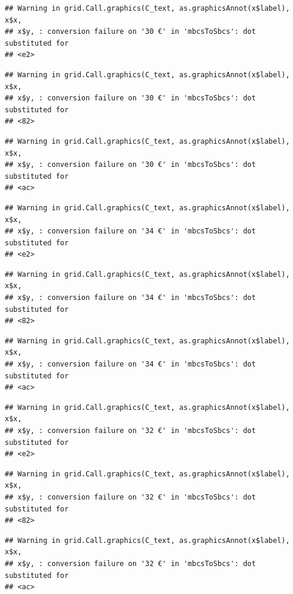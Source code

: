 \documentclass[]{gitbook}
\theoremstyle{definition}
\theoremstyle{definition}
\theoremstyle{definition}
\theoremstyle{remark}
\begin{document}
\begin{verbatim}
## Warning in grid.Call.graphics(C_text, as.graphicsAnnot(x$label), x$x,
## x$y, : conversion failure on '30 €' in 'mbcsToSbcs': dot substituted for
## <e2>
\end{verbatim}

\begin{verbatim}
## Warning in grid.Call.graphics(C_text, as.graphicsAnnot(x$label), x$x,
## x$y, : conversion failure on '30 €' in 'mbcsToSbcs': dot substituted for
## <82>
\end{verbatim}

\begin{verbatim}
## Warning in grid.Call.graphics(C_text, as.graphicsAnnot(x$label), x$x,
## x$y, : conversion failure on '30 €' in 'mbcsToSbcs': dot substituted for
## <ac>
\end{verbatim}

\begin{verbatim}
## Warning in grid.Call.graphics(C_text, as.graphicsAnnot(x$label), x$x,
## x$y, : conversion failure on '34 €' in 'mbcsToSbcs': dot substituted for
## <e2>
\end{verbatim}

\begin{verbatim}
## Warning in grid.Call.graphics(C_text, as.graphicsAnnot(x$label), x$x,
## x$y, : conversion failure on '34 €' in 'mbcsToSbcs': dot substituted for
## <82>
\end{verbatim}

\begin{verbatim}
## Warning in grid.Call.graphics(C_text, as.graphicsAnnot(x$label), x$x,
## x$y, : conversion failure on '34 €' in 'mbcsToSbcs': dot substituted for
## <ac>
\end{verbatim}

\begin{verbatim}
## Warning in grid.Call.graphics(C_text, as.graphicsAnnot(x$label), x$x,
## x$y, : conversion failure on '32 €' in 'mbcsToSbcs': dot substituted for
## <e2>
\end{verbatim}

\begin{verbatim}
## Warning in grid.Call.graphics(C_text, as.graphicsAnnot(x$label), x$x,
## x$y, : conversion failure on '32 €' in 'mbcsToSbcs': dot substituted for
## <82>
\end{verbatim}

\begin{verbatim}
## Warning in grid.Call.graphics(C_text, as.graphicsAnnot(x$label), x$x,
## x$y, : conversion failure on '32 €' in 'mbcsToSbcs': dot substituted for
## <ac>
\end{verbatim}
\end{document}
